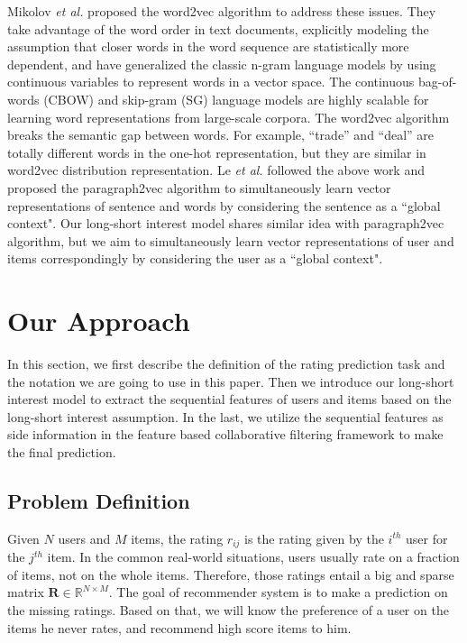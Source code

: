 \documentclass{sig-alternate-05-2015}
\begin{document}
Mikolov \textit{et al.} \cite{mikolov2013efficient, mikolov2013distributed} proposed
the word2vec algorithm to address these issues. They take advantage of the word order
in text documents, explicitly modeling the assumption that closer words in the word
sequence are statistically more dependent, and have generalized the classic n-gram
language models by using continuous variables to represent words in a vector space.
The continuous bag-of-words (CBOW) and skip-gram (SG) language models are highly
scalable for learning word representations from large-scale corpora.
The word2vec algorithm breaks the semantic gap between words.
For example, ``trade'' and ``deal'' are totally different words in the one-hot representation,
but they are similar in word2vec distribution representation.
Le \textit{et al.} \cite{le2014distributed} followed the above work and proposed
the paragraph2vec algorithm to simultaneously learn vector representations of sentence
and words by considering the sentence as a ``global context".
Our long-short interest model shares similar idea with paragraph2vec algorithm,
but we aim to simultaneously learn vector representations of user and items
correspondingly by considering the user as a ``global context".

\section{Our Approach}
In this section,
we first describe the definition of the rating prediction task and
the notation we are going to use in this paper.
Then we introduce our long-short interest model to extract the sequential features
of users and items based on the long-short interest assumption.
In the last, we utilize the sequential features as side information
in the feature based collaborative filtering framework to make the final prediction.

\subsection{Problem Definition}
Given $N$ users and $M$ items, the rating $r_{ij}$ is the rating given by
the $i^{th}$ user for the $j^{th}$ item.
In the common real-world situations,
users usually rate on a fraction of items, not on the whole items.
Therefore,
those ratings entail a big and sparse matrix $\mathbf{R} \in \mathbb{R}^{N \times M}$.
The goal of recommender system is to make a prediction on the missing ratings.
Based on that, we will know the preference of a user on the items he never rates,
and recommend high score items to him.
\end{document}
